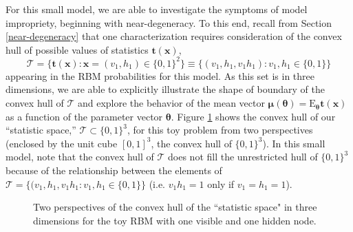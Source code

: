 \documentclass[12pt]{article}
\theoremstyle{definition}
\begin{document}
For this small model, we are able to investigate the symptoms of model
impropriety, beginning with near-degeneracy. To this end, recall from
Section \ref{near-degeneracy} that one characterization requires
consideration of the convex hull of possible values of statistics
\(\boldsymbol t(\boldsymbol x)\), \[
\mathcal{T} = \{\boldsymbol t(\boldsymbol x): \boldsymbol x = (v_1, h_1) \in \{0,1\}^2\} \equiv \{(v_1, h_1, v_1 h_1): v_1, h_1 \in \{0,1\}\}
\] appearing in the RBM probabilities for this model. As this set is in
three dimensions, we are able to explicitly illustrate the shape of
boundary of the convex hull of \(\mathcal{T}\) and explore the behavior
of the mean vector
\(\boldsymbol \mu(\boldsymbol \theta) = \text{E}_{\boldsymbol \theta} \boldsymbol t(\boldsymbol x)\)
as a function of the parameter vector \(\boldsymbol \theta\). Figure
\ref{fig:toyhull} shows the convex hull of our ``statistic space,''
\(\mathcal{T} \subset \{0,1\}^3\), for this toy problem from two
perspectives (enclosed by the unit cube \([0,1]^3\), the convex hull of
\(\{0,1\}^3\)). In this small model, note that the convex hull of
\(\mathcal{T}\) does not fill the unrestricted hull of \(\{0,1\}^3\)
because of the relationship between the elements of
\(\mathcal{T} = \{(v_1, h_1, v_1 h_1 : v_1, h_1 \in \{0, 1\} \}\) (i.e.
\(v_1 h_1 = 1\) only if \(v_1 = h_1 = 1\)). \par
\begin{figure}[ht]
  \begin{minipage}{0.45\textwidth}
  \end{minipage}
  \begin{minipage}{0.45\textwidth}
  \end{minipage}
  \caption{Two perspectives of the convex hull of the ``statistic space" in three dimensions for the toy RBM with one visible and one hidden node.}
\label{fig:toyhull}
\end{figure}
\end{document}
